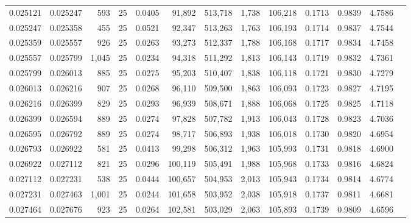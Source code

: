 \begin{tabular}{rrrrrrrrrrrrr}
0.025121 & 0.025247 &   593 &  25 &                                     0.0405 &  91,892 & 513,718 &   1,738 & 106,218 & 0.1713 & 0.9839 & 4.7586 \\
0.025247 & 0.025358 &   455 &  25 &                                     0.0521 &  92,347 & 513,263 &   1,763 & 106,193 & 0.1714 & 0.9837 & 4.7544 \\
0.025359 & 0.025557 &   926 &  25 &                                     0.0263 &  93,273 & 512,337 &   1,788 & 106,168 & 0.1717 & 0.9834 & 4.7458 \\
0.025557 & 0.025799 & 1,045 &  25 &                                     0.0234 &  94,318 & 511,292 &   1,813 & 106,143 & 0.1719 & 0.9832 & 4.7361 \\
0.025799 & 0.026013 &   885 &  25 &                                     0.0275 &  95,203 & 510,407 &   1,838 & 106,118 & 0.1721 & 0.9830 & 4.7279 \\
0.026013 & 0.026216 &   907 &  25 &                                     0.0268 &  96,110 & 509,500 &   1,863 & 106,093 & 0.1723 & 0.9827 & 4.7195 \\
0.026216 & 0.026399 &   829 &  25 &                                     0.0293 &  96,939 & 508,671 &   1,888 & 106,068 & 0.1725 & 0.9825 & 4.7118 \\
0.026399 & 0.026594 &   889 &  25 &                                     0.0274 &  97,828 & 507,782 &   1,913 & 106,043 & 0.1728 & 0.9823 & 4.7036 \\
0.026595 & 0.026792 &   889 &  25 &                                     0.0274 &  98,717 & 506,893 &   1,938 & 106,018 & 0.1730 & 0.9820 & 4.6954 \\
0.026793 & 0.026922 &   581 &  25 &                                     0.0413 &  99,298 & 506,312 &   1,963 & 105,993 & 0.1731 & 0.9818 & 4.6900 \\
0.026922 & 0.027112 &   821 &  25 &                                     0.0296 & 100,119 & 505,491 &   1,988 & 105,968 & 0.1733 & 0.9816 & 4.6824 \\
0.027112 & 0.027231 &   538 &  25 &                                     0.0444 & 100,657 & 504,953 &   2,013 & 105,943 & 0.1734 & 0.9814 & 4.6774 \\
0.027231 & 0.027463 & 1,001 &  25 &                                     0.0244 & 101,658 & 503,952 &   2,038 & 105,918 & 0.1737 & 0.9811 & 4.6681 \\
0.027464 & 0.027676 &   923 &  25 &                                     0.0264 & 102,581 & 503,029 &   2,063 & 105,893 & 0.1739 & 0.9809 & 4.6596 \\

\end{tabular}
